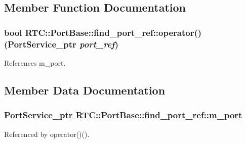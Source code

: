 \subsection{Member Function Documentation}
\subsubsection[{operator()}]{\setlength{\rightskip}{0pt plus 5cm}bool RTC::PortBase::find\_\-port\_\-ref::operator() (PortService\_\-ptr {\em port\_\-ref})\hspace{0.3cm}{\ttfamily  [inline]}}\label{structRTC_1_1PortBase_1_1find__port__ref_a967c45942757ed5aabf768f68f5d7d89}


References m\_\-port.



\subsection{Member Data Documentation}
\subsubsection[{m\_\-port}]{\setlength{\rightskip}{0pt plus 5cm}PortService\_\-ptr {\bf RTC::PortBase::find\_\-port\_\-ref::m\_\-port}}\label{structRTC_1_1PortBase_1_1find__port__ref_a83a1c3cd2fb4a1a5986383e1836b6ec5}


Referenced by operator()().

